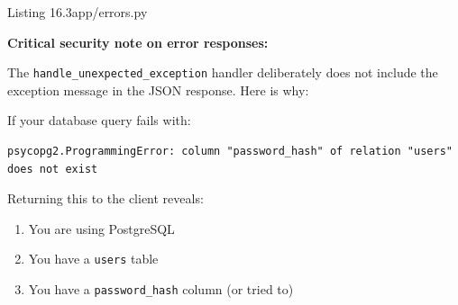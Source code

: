 \begin{codeboxcap}{\textcolor{accent}{Listing 16.3}\enspace app/errors.py}
\begin{Shaded}
\begin{Highlighting}[]
\StringTok{ }
            \NormalTok{: }\NormalTok{,}
\NormalTok{        \}), }
\end{Highlighting}
\end{Shaded}

\end{codeboxcap}

\begin{warnbox}

\textbf{Critical security note on error responses:}

\end{warnbox}

\noindent{}The \texttt{handle\_}\allowbreak{}\texttt{unexpected\_}\allowbreak{}\texttt{exception} handler deliberately does not include the exception message in the JSON response. Here is why:

If your database query fails with:

\begin{outputbox}[short]
\begin{Verbatim}[fontsize=\codesize, breaklines, breakanywhere, breaksymbolleft={\tiny\textcolor{muted}{$\hookrightarrow$}}]
psycopg2.ProgrammingError: column "password_hash" of relation "users" does not exist
\end{Verbatim}
\end{outputbox}

\noindent{}Returning this to the client reveals:

\begin{enumerate}
\def\labelenumi{\arabic{enumi}.}
\tightlist
\item
  You are using PostgreSQL
\item
  You have a \texttt{users} table
\item
  You have a \texttt{password\_hash} column (or tried to)
\end{enumerate}

